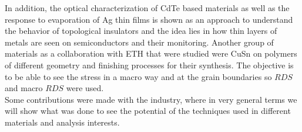 In addition, the optical characterization of CdTe based materials as well as the response to evaporation of Ag thin films is shown as an approach to understand the behavior of topological insulators and the idea lies in how thin layers of metals are seen on semiconductors and their monitoring. Another group of materials as a collaboration with ETH that were studied were CuSn on polymers of different geometry and finishing processes for their synthesis. The objective is to be able to see the stress in a macro way and at the grain boundaries so $RDS$ and macro $RDS$ were used. \\
Some contributions were made with the industry, where in very general terms we will show what was done to see the potential of the techniques used in different materials and analysis interests. 





%